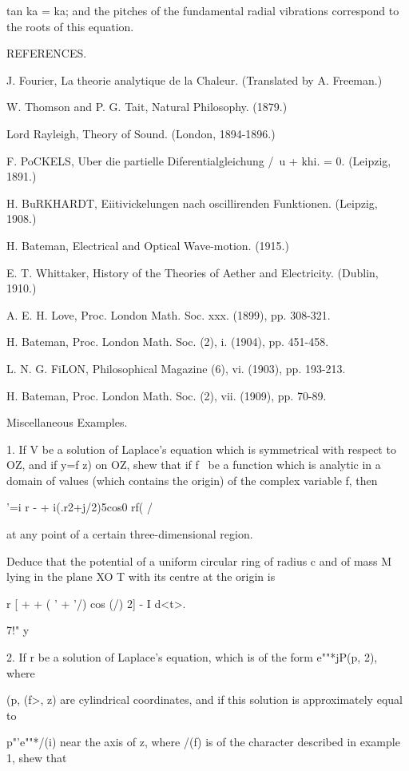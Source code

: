 tan ka = ka; and the pitches of the fundamental radial vibrations
correspond to the roots of this equation.

REFERENCES.

J. Fourier, La theorie analytique de la Chaleur. (Translated by A.
Freeman.)

W. Thomson and P. G. Tait, Natural Philosophy. (1879.)

Lord Rayleigh, Theory of Sound. (London, 1894-1896.)

F. PoCKELS, Uber die partielle Diferentialgleichung /\ u + khi. = 0.
(Leipzig, 1891.)

H. BuRKHARDT, Eiitivickelungen nach oscillirenden Funktionen.
(Leipzig, 1908.)

H. Bateman, Electrical and Optical Wave-motion. (1915.)

E. T. Whittaker, History of the Theories of Aether and Electricity.
(Dublin, 1910.)

A. E. H. Love, Proc. London Math. Soc. xxx. (1899), pp. 308-321.

H. Bateman, Proc. London Math. Soc. (2), i. (1904), pp. 451-458.

L. N. G. FiLON, Philosophical Magazine (6), vi. (1903), pp. 193-213.

H. Bateman, Proc. London Math. Soc. (2), vii. (1909), pp. 70-89.

Miscellaneous Examples.

1. If V be a solution of Laplace's equation which is symmetrical with
respect to OZ, and if y=f z) on OZ, shew that if f \ be a function
which is analytic in a domain of values (which contains the origin) of
the complex variable f, then

'=i r - + i(.r2+j/2)5cos0 rf( /

at any point of a certain three-dimensional region.

Deduce that the potential of a uniform circular ring of radius c and
of mass M lying in the plane XO T with its centre at the origin is

  r [ + + ( ' + '/) cos (/) 2] - I d<t>.

7!" y

%
%

2. If r be a solution of Laplace's equation, which is of the form
e""*jP(p, 2), where

(p, (f>, z) are cylindrical coordinates, and if this solution is
approximately equal to

p"'e""*/(i) near the axis of z, where /(f) is of the character
described in example 1, shew that

